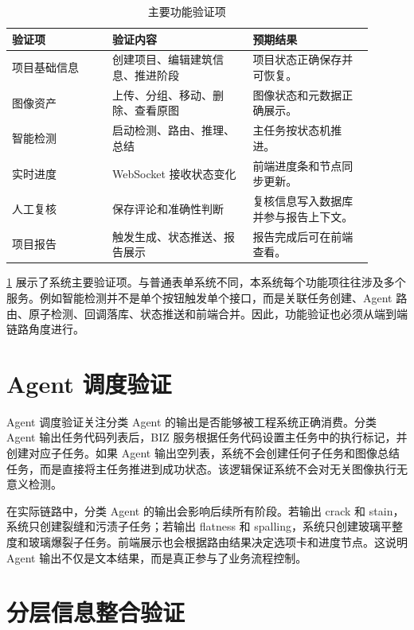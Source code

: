 \begin{table}[!htb]
  \caption{主要功能验证项}\label{tab:function-validation}
  \centering
  \begin{tabular}{@{}p{0.25\linewidth}p{0.35\linewidth}p{0.30\linewidth}@{}} \toprule
    \textbf{验证项} & \textbf{验证内容} & \textbf{预期结果} \\ \midrule
    项目基础信息 & 创建项目、编辑建筑信息、推进阶段 & 项目状态正确保存并可恢复。 \\
    图像资产 & 上传、分组、移动、删除、查看原图 & 图像状态和元数据正确展示。 \\
    智能检测 & 启动检测、路由、推理、总结 & 主任务按状态机推进。 \\
    实时进度 & WebSocket 接收状态变化 & 前端进度条和节点同步更新。 \\
    人工复核 & 保存评论和准确性判断 & 复核信息写入数据库并参与报告上下文。 \\
    项目报告 & 触发生成、状态推送、报告展示 & 报告完成后可在前端查看。 \\ \bottomrule
  \end{tabular}
\end{table}

\cref{tab:function-validation} 展示了系统主要验证项。与普通表单系统不同，本系统每个功能项往往涉及多个服务。例如智能检测并不是单个按钮触发单个接口，而是关联任务创建、Agent 路由、原子检测、回调落库、状态推送和前端合并。因此，功能验证也必须从端到端链路角度进行。

\section{Agent 调度验证}
\label{sec:agent-routing-validation}

Agent 调度验证关注分类 Agent 的输出是否能够被工程系统正确消费。分类 Agent 输出任务代码列表后，BIZ 服务根据任务代码设置主任务中的执行标记，并创建对应子任务。如果 Agent 输出空列表，系统不会创建任何子任务和图像总结任务，而是直接将主任务推进到成功状态。该逻辑保证系统不会对无关图像执行无意义检测。

在实际链路中，分类 Agent 的输出会影响后续所有阶段。若输出 crack 和 stain，系统只创建裂缝和污渍子任务；若输出 flatness 和 spalling，系统只创建玻璃平整度和玻璃爆裂子任务。前端展示也会根据路由结果决定选项卡和进度节点。这说明 Agent 输出不仅是文本结果，而是真正参与了业务流程控制。

\section{分层信息整合验证}
\label{sec:hierarchical-validation}

